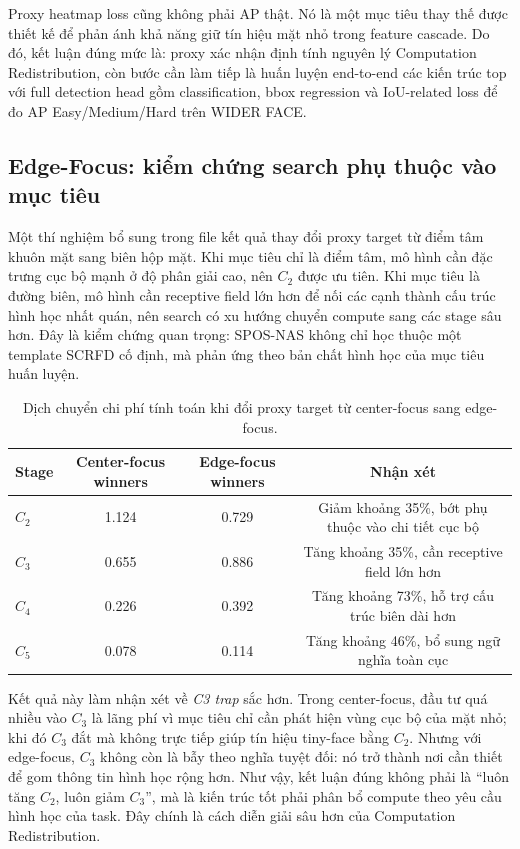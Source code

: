 Proxy heatmap loss cũng không phải AP thật. Nó là một mục tiêu thay thế được thiết kế để phản ánh khả năng giữ tín hiệu mặt nhỏ trong feature cascade. Do đó, kết luận đúng mức là: proxy xác nhận định tính nguyên lý Computation Redistribution, còn bước cần làm tiếp là huấn luyện end-to-end các kiến trúc top với full detection head gồm classification, bbox regression và IoU-related loss để đo AP Easy/Medium/Hard trên WIDER FACE.

\subsection{Edge-Focus: kiểm chứng search phụ thuộc vào mục tiêu}

Một thí nghiệm bổ sung trong file kết quả thay đổi proxy target từ điểm tâm khuôn mặt sang biên hộp mặt. Khi mục tiêu chỉ là điểm tâm, mô hình cần đặc trưng cục bộ mạnh ở độ phân giải cao, nên \(C_2\) được ưu tiên. Khi mục tiêu là đường biên, mô hình cần receptive field lớn hơn để nối các cạnh thành cấu trúc hình học nhất quán, nên search có xu hướng chuyển compute sang các stage sâu hơn. Đây là kiểm chứng quan trọng: SPOS-NAS không chỉ học thuộc một template SCRFD cố định, mà phản ứng theo bản chất hình học của mục tiêu huấn luyện.

\begin{table}[H]
\centering
\caption{Dịch chuyển chi phí tính toán khi đổi proxy target từ center-focus sang edge-focus.}
\small
\begin{tabular}{@{}lccc@{}}
\toprule
\textbf{Stage} & \textbf{Center-focus winners} & \textbf{Edge-focus winners} & \textbf{Nhận xét} \\
\midrule
\(C_2\) & 1.124 & 0.729 & Giảm khoảng 35\%, bớt phụ thuộc vào chi tiết cục bộ \\
\(C_3\) & 0.655 & 0.886 & Tăng khoảng 35\%, cần receptive field lớn hơn \\
\(C_4\) & 0.226 & 0.392 & Tăng khoảng 73\%, hỗ trợ cấu trúc biên dài hơn \\
\(C_5\) & 0.078 & 0.114 & Tăng khoảng 46\%, bổ sung ngữ nghĩa toàn cục \\
\bottomrule
\end{tabular}
\end{table}

Kết quả này làm nhận xét về \textit{C3 trap} sắc hơn. Trong center-focus, đầu tư quá nhiều vào \(C_3\) là lãng phí vì mục tiêu chỉ cần phát hiện vùng cục bộ của mặt nhỏ; khi đó \(C_3\) đắt mà không trực tiếp giúp tín hiệu tiny-face bằng \(C_2\). Nhưng với edge-focus, \(C_3\) không còn là bẫy theo nghĩa tuyệt đối: nó trở thành nơi cần thiết để gom thông tin hình học rộng hơn. Như vậy, kết luận đúng không phải là ``luôn tăng \(C_2\), luôn giảm \(C_3\)'', mà là kiến trúc tốt phải phân bổ compute theo yêu cầu hình học của task. Đây chính là cách diễn giải sâu hơn của Computation Redistribution.

